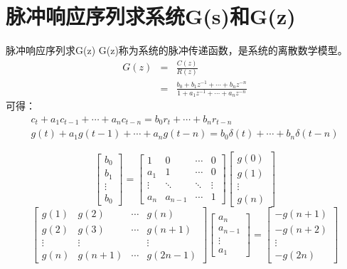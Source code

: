 \section{脉冲响应序列求系统G(s)和G(z)}
\begin{frame}{脉冲响应序列求G(z)}
G(z)称为系统的脉冲传递函数，是系统的离散数学模型。
\begin{eqnarray*}
G(z)&=&\frac{C(z)}{R(z)}  \\
&=&\frac{b_0+b_1 z^{-1}+\cdots+b_n z^{-n}}{1+a_1 z^{-1}+\cdots+a_n z^{-n}}
\end{eqnarray*}
可得：
\begin{eqnarray*}
c_t+a_1 c_{t-1}+\cdots+ a_n c_{t-n} =  b_0 r_t+ \cdots + b_n r_{t-n}  \\
g(t)+a_1 g(t-1)+\cdots+ a_n g(t-n) =  b_0 \delta(t)+ \cdots + b_n \delta(t-n)
\end{eqnarray*}
\end{frame}
\begin{frame}
$$
\begin{bmatrix}
b_0 \\
b_1 \\
\vdots \\
b_0 
\end{bmatrix}
=
\begin{bmatrix}
1 & 0 & \cdots & 0 \\
a_1 & 1 & \cdots & 0 \\
\vdots & \ddots & \ddots & \vdots \\
a_n & a_{n-1} & \cdots & 1
\end{bmatrix}
\begin{bmatrix}
g(0) \\
g(1) \\
\vdots \\
g(n)
\end{bmatrix}
$$
$$
\begin{bmatrix}
g(1) & g(2) & \cdots & g(n)  \\
g(2) & g(3) & \cdots & g(n+1) \\
\vdots & \vdots &  & \vdots \\
g(n) & g(n+1) & \cdots & g(2n-1)
\end{bmatrix}
\begin{bmatrix}
a_n \\
a_{n-1} \\
\vdots \\
a_1
\end{bmatrix}
=
\begin{bmatrix}
-g(n+1) \\
-g(n+2) \\
\vdots  \\
-g(2n)
\end{bmatrix}
$$
\end{frame}

